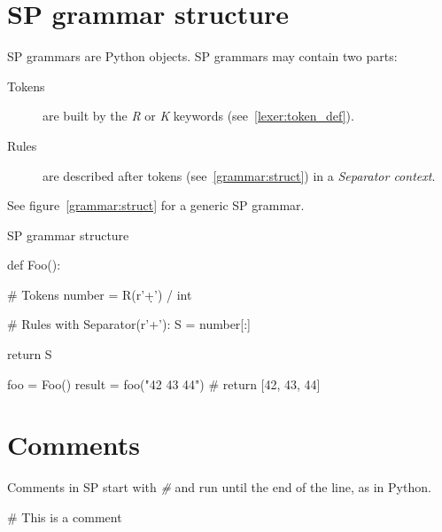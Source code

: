 \section{SP grammar structure}

SP grammars are Python objects.
SP grammars may contain two parts:

\begin{description}
    \item [Tokens]
        are built by the \emph{R} or \emph{K} keywords (see~\ref{lexer:token_def}).
    \item [Rules]
        are described after tokens (see~\ref{grammar:struct}) in a \emph{Separator context}.
\end{description}

See figure~\ref{grammar:struct} for a generic SP grammar.

\begin{code}
\caption{SP grammar structure}                             \label{grammar:struct}
\begin{verbatimtab}[4]
def Foo():

    # Tokens
    number = R(r'\d+') / int

    # Rules
    with Separator(r'\s+'):
        S = number[:]

    return S

foo = Foo()
result = foo("42 43 44") # return [42, 43, 44]
\end{verbatimtab}
\end{code}

\section{Comments}

Comments in SP start with \emph{\#} and run until the end of the line, as in Python.

\begin{verbatimtab}[4]
    # This is a comment
\end{verbatimtab}

